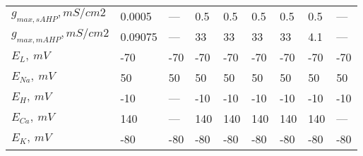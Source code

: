 \begin{longtable}{lllllllll}
$g_{max, sAHP}, mS/cm2 $ &   0.0005 &    --- &       0.5 &       0.5 &       0.5 &     0.5 &     0.5 &    --- \\
$ g_{max, mAHP}, mS/cm2 $ &  0.09075 &    --- &        33 &        33 &        33 &      33 &     4.1 &    --- \\
$E_L, \ mV$ &      -70 &    -70 &       -70 &       -70 &       -70 &     -70 &     -70 &    -70 \\
$ E_{Na},\ mV$ &       50 &     50 &        50 &        50 &        50 &      50 &      50 &     50 \\
$E_H,\ mV$ &      -10 &    --- &       -10 &       -10 &       -10 &     -10 &     -10 &    -10 \\
$E_{Ca},\ mV$ &      140 &    --- &       140 &       140 &       140 &     140 &     140 &    --- \\
$E_K,\ mV$ &      -80 &    -80 &       -80 &       -80 &       -80 &     -80 &     -80 &    -80 \\
\end{longtable}
